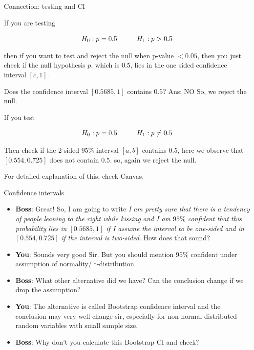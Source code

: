 \documentclass{beamer}\usepackage[]{graphicx}\usepackage[]{color}
\begin{document}
\begin{frame}{Connection: testing and CI}

If you are testing

$$ H_0 : p = 0.5 \hspace{1 cm}  H_1: p > 0.5 $$ \pause

then if you want to test and reject the null when p-value $< 0.05$, then you just check if the null hypothesis $p$, which is $0.5$, lies in the one sided confidence interval $[c,1]$.  \pause

Does the confidence interval $ [0.5685, 1] $ contains $0.5$?  Ans: NO
So, we reject the null.\pause

If you test

$$ H_0 : p = 0.5 \hspace{1 cm}  H_1: p \neq 0.5 $$ \pause

Then check if the 2-sided $95 \%$ interval $ [a, b] $ contains $0.5$, here we observe that $\left [ 0.554, 0.725 \right ] $ does not contain $0.5$. so, again we reject the null.  \pause

For detailed explanation of this, check Canvas. \pause

\end{frame}

\begin{frame}{Confidence intervals}

\begin{itemize}

\item \textbf{Boss}: Great! So, I am going to write \textit{I am pretty sure that there is a tendency of people leaning to the right while kissing and I am $95 \%$ confident that this probability lies in $ [ 0.5685, 1] $ if I assume the interval to be one-sided and in $ [ 0.554, 0.725 ] $ if the interval is two-sided}. How does that sound? \pause

\item \textbf{You}: Sounds very good Sir. But you should mention $95 \%$ confident under assumption of normality/ t-distribution.  \pause

\item \textbf{Boss}: What other alternative did we have? Can the conclusion change if we drop the assumption? \pause

\item \textbf{You}: The alternative is called Bootstrap confidence interval and the conclusion may very well change sir, especially for non-normal distributed random variables with small sample size.  \pause

\item \textbf{Boss}: Why don't you calculate this Bootstrap CI and check? \pause

\end{itemize}

\end{frame}
\end{document}
